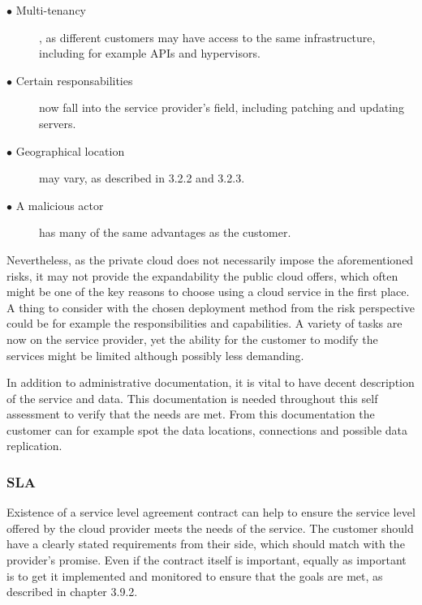 \documentclass{article}
\begin{document}
\begin{description}
	\item[$\bullet$ Multi-tenancy], as different customers may have access to the same infrastructure, including for example APIs and hypervisors.
	\item[$\bullet$ Certain responsabilities] now fall into the service provider's field, including patching and updating servers.
	\item[$\bullet$ Geographical location] may vary, as described in 3.2.2 and 3.2.3.
	\item[$\bullet$ A malicious actor] has many of the same advantages as the customer.
\end{description}

Nevertheless, as the private cloud does not necessarily impose the aforementioned risks, it may not provide the expandability the public cloud offers, which often might be one of the key reasons to choose using a cloud service in the first place.
A thing to consider with the chosen deployment method from the risk perspective could be for example the responsibilities and capabilities. A variety of tasks are now on the service provider, yet the ability for the customer to modify the services might be limited although possibly less demanding.
\par
In addition to administrative documentation, it is vital to have decent description of the service and data. This documentation is needed throughout this self assessment to verify that the needs are met. From this documentation the customer can for example spot the data locations, connections and possible data replication.

\subsubsection{SLA}
Existence of a service level agreement contract can help to ensure the service level offered by the cloud provider meets the needs of the service. The customer should have a clearly stated requirements from their side, which should match with the provider's promise. Even if the contract itself is important, equally as important is to get it implemented and monitored to ensure that the goals are met, as described in chapter 3.9.2.
\end{document}
